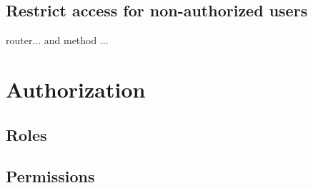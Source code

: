 \subsection{Restrict access for non-authorized users}
router... and method ...


\section{Authorization}\label{sec:authorization}

\subsection{Roles}

\subsection{Permissions}





